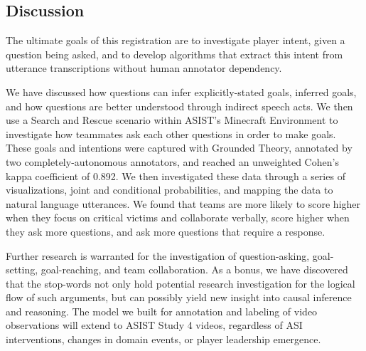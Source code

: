 \subsection{Discussion}

The ultimate goals of this registration are to investigate player intent, given
a question being asked, and to develop algorithms that extract this intent from
utterance transcriptions without human annotator dependency.

We have discussed how questions can infer explicitly-stated goals, inferred
goals, and how questions are better understood through indirect speech acts. We
then use a Search and Rescue scenario within ASIST's Minecraft Environment to
investigate how teammates ask each other questions in order to make goals.
These goals and intentions were captured with Grounded Theory, annotated by two
completely-autonomous annotators, and reached an unweighted Cohen's kappa
coefficient of 0.892. We then investigated these data through a series of
visualizations, joint and conditional probabilities, and mapping the data to
natural language utterances. We found that teams are more likely to score
higher when they focus on critical victims and collaborate verbally, score
higher when they ask more questions, and ask more questions that require a
response.

Further research is warranted for the investigation of question-asking,
goal-setting, goal-reaching, and team collaboration. As a bonus, we have
discovered that the stop-words not only hold potential research investigation
for the logical flow of such arguments, but can possibly yield new insight into
causal inference and reasoning. The model we built for annotation and labeling
of video observations will extend to ASIST Study 4 videos, regardless of ASI
interventions, changes in domain events, or player leadership emergence.
